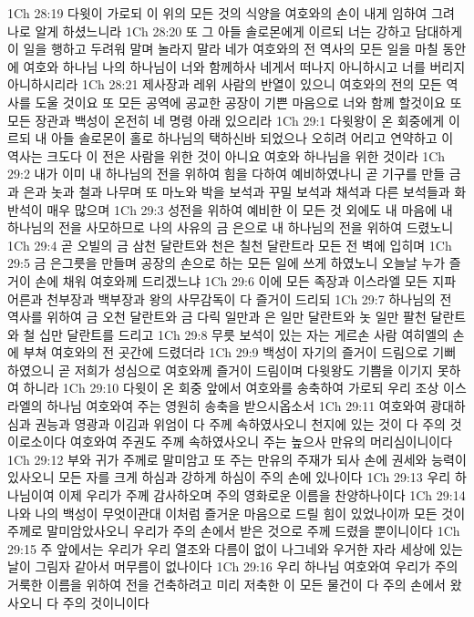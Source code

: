 1Ch 28:19  다윗이 가로되 이 위의 모든 것의 식양을 여호와의 손이 내게 임하여 그려 나로 알게 하셨느니라
1Ch 28:20  또 그 아들 솔로몬에게 이르되 너는 강하고 담대하게 이 일을 행하고 두려워 말며 놀라지 말라 네가 여호와의 전 역사의 모든 일을 마칠 동안에 여호와 하나님 나의 하나님이 너와 함께하사 네게서 떠나지 아니하시고 너를 버리지 아니하시리라
1Ch 28:21  제사장과 레위 사람의 반열이 있으니 여호와의 전의 모든 역사를 도울 것이요 또 모든 공역에 공교한 공장이 기쁜 마음으로 너와 함께 할것이요 또 모든 장관과 백성이 온전히 네 명령 아래 있으리라
1Ch 29:1  다윗왕이 온 회중에게 이르되 내 아들 솔로몬이 홀로 하나님의 택하신바 되었으나 오히려 어리고 연약하고 이 역사는 크도다 이 전은 사람을 위한 것이 아니요 여호와 하나님을 위한 것이라
1Ch 29:2  내가 이미 내 하나님의 전을 위하여 힘을 다하여 예비하였나니 곧 기구를 만들 금과 은과 놋과 철과 나무며 또 마노와 박을 보석과 꾸밀 보석과 채석과 다른 보석들과 화반석이 매우 많으며
1Ch 29:3  성전을 위하여 예비한 이 모든 것 외에도 내 마음에 내 하나님의 전을 사모하므로 나의 사유의 금 은으로 내 하나님의 전을 위하여 드렸노니
1Ch 29:4  곧 오빌의 금 삼천 달란트와 천은 칠천 달란트라 모든 전 벽에 입히며
1Ch 29:5  금 은그릇을 만들며 공장의 손으로 하는 모든 일에 쓰게 하였노니 오늘날 누가 즐거이 손에 채워 여호와께 드리겠느냐
1Ch 29:6  이에 모든 족장과 이스라엘 모든 지파 어른과 천부장과 백부장과 왕의 사무감독이 다 즐거이 드리되
1Ch 29:7  하나님의 전 역사를 위하여 금 오천 달란트와 금 다릭 일만과 은 일만 달란트와 놋 일만 팔천 달란트와 철 십만 달란트를 드리고
1Ch 29:8  무릇 보석이 있는 자는 게르손 사람 여히엘의 손에 부쳐 여호와의 전 곳간에 드렸더라
1Ch 29:9  백성이 자기의 즐거이 드림으로 기뻐하였으니 곧 저희가 성심으로 여호와께 즐거이 드림이며 다윗왕도 기쁨을 이기지 못하여 하니라
1Ch 29:10  다윗이 온 회중 앞에서 여호와를 송축하여 가로되 우리 조상 이스라엘의 하나님 여호와여 주는 영원히 송축을 받으시옵소서
1Ch 29:11  여호와여 광대하심과 권능과 영광과 이김과 위엄이 다 주께 속하였사오니 천지에 있는 것이 다 주의 것이로소이다 여호와여 주권도 주께 속하였사오니 주는 높으사 만유의 머리심이니이다
1Ch 29:12  부와 귀가 주께로 말미암고 또 주는 만유의 주재가 되사 손에 권세와 능력이 있사오니 모든 자를 크게 하심과 강하게 하심이 주의 손에 있나이다
1Ch 29:13  우리 하나님이여 이제 우리가 주께 감사하오며 주의 영화로운 이름을 찬양하나이다
1Ch 29:14  나와 나의 백성이 무엇이관대 이처럼 즐거운 마음으로 드릴 힘이 있었나이까 모든 것이 주께로 말미암았사오니 우리가 주의 손에서 받은 것으로 주께 드렸을 뿐이니이다
1Ch 29:15  주 앞에서는 우리가 우리 열조와 다름이 없이 나그네와 우거한 자라 세상에 있는 날이 그림자 같아서 머무름이 없나이다
1Ch 29:16  우리 하나님 여호와여 우리가 주의 거룩한 이름을 위하여 전을 건축하려고 미리 저축한 이 모든 물건이 다 주의 손에서 왔사오니 다 주의 것이니이다
